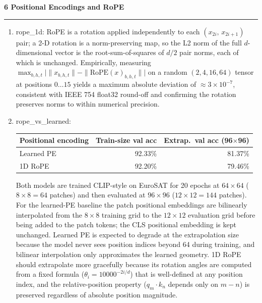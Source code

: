 \documentclass[11pt]{article}
\newenvironment{question}[1]
    {
        \begin{center}
        \textbf{#1} \rmfamily
        \bigskip
        \hrule
    }
    {
        \end{center}
    }
\begin{document}
\begin{question}{6 Positional Encodings and RoPE}
\begin{enumerate}[label=\textbf{\arabic*.}]

    \item rope\_1d: RoPE is a rotation applied independently to each
    $(x_{2i},\,x_{2i+1})$ pair; a 2-D rotation is a norm-preserving map,
    so the L2 norm of the full $d$-dimensional vector is the root-sum-of-squares
    of $d/2$ pair norms, each of which is unchanged.
    Empirically, measuring
    $\max_{b,h,t}\bigl|\|x_{b,h,t}\|-\|\mathrm{RoPE}(x)_{b,h,t}\|\bigr|$
    on a random $(2,4,16,64)$ tensor at positions $0\ldots15$ yields a
    maximum absolute deviation of $\approx 3\times10^{-7}$, consistent with
    IEEE 754 float32 round-off and confirming the rotation preserves norms
    to within numerical precision.

    \item rope\_vs\_learned:

    \begin{center}
    \begin{tabular}{lrr}
    \toprule
    Positional encoding & Train-size val acc & Extrap.\ val acc (96$\times$96) \\
    \midrule
    Learned PE          & 92.33\% & 81.37\% \\
    1D RoPE             & 92.20\% & 79.46\% \\
    \bottomrule
    \end{tabular}
    \end{center}

    Both models are trained CLIP-style on EuroSAT for 20 epochs at $64\times64$
    ($8\times8=64$ patches) and then evaluated at $96\times96$ ($12\times12=144$
    patches).
    For the learned-PE baseline the patch positional embeddings are bilinearly
    interpolated from the $8\times8$ training grid to the $12\times12$
    evaluation grid before being added to the patch tokens; the CLS positional
    embedding is kept unchanged.
    Learned PE is expected to degrade at the extrapolation size because the
    model never sees position indices beyond 64 during training, and bilinear
    interpolation only approximates the learned geometry.
    1D RoPE should extrapolate more gracefully because its rotation angles are
    computed from a fixed formula ($\theta_i = 10000^{-2i/d}$) that is
    well-defined at any position index, and the relative-position property
    ($q_m\cdot k_n$ depends only on $m-n$) is preserved regardless of absolute
    position magnitude.


\end{enumerate}
\end{question}
\end{document}
